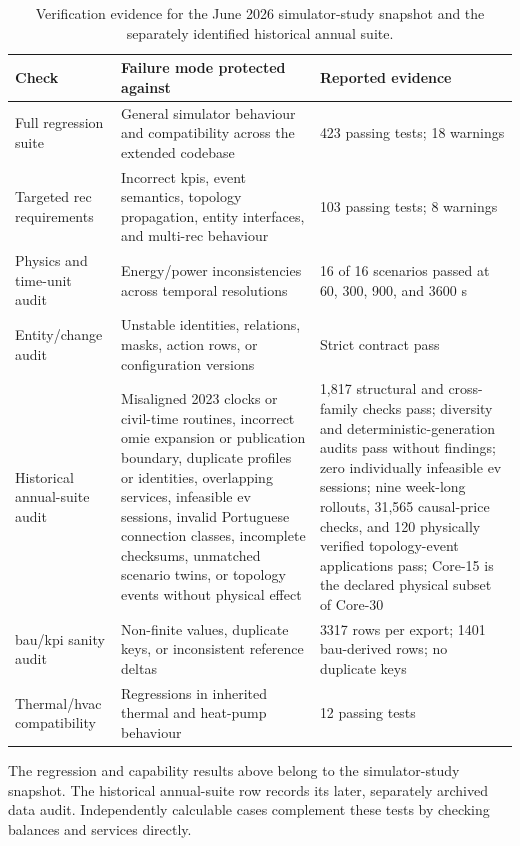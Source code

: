 \begin{table}[H]
\centering
\caption{Verification evidence for the June 2026 simulator-study snapshot and the separately identified historical annual suite.}
\label{tab:sim-validation-evidence}
\footnotesize
\begin{tabularx}{\textwidth}{@{}p{}X p{}@{}}
\toprule
\textbf{Check} & \textbf{Failure mode protected against} & \textbf{Reported evidence} \\
\midrule
Full regression suite & General simulator behaviour and compatibility across the extended codebase & 423 passing tests; 18 warnings \\
Targeted \gls{rec} requirements & Incorrect \glspl{kpi}, event semantics, topology propagation, entity interfaces, and multi-\gls{rec} behaviour & 103 passing tests; 8 warnings \\
Physics and time-unit audit & Energy/power inconsistencies across temporal resolutions & 16 of 16 scenarios passed at 60, 300, 900, and 3600 s \\
Entity/change audit & Unstable identities, relations, masks, action rows, or configuration versions & Strict contract pass \\
Historical annual-suite audit & Misaligned 2023 clocks or civil-time routines, incorrect \gls{omie} expansion or publication boundary, duplicate profiles or identities, overlapping services, infeasible \gls{ev} sessions, invalid Portuguese connection classes, incomplete checksums, unmatched scenario twins, or topology events without physical effect & 1,817 structural and cross-family checks pass; diversity and deterministic-generation audits pass without findings; zero individually infeasible \gls{ev} sessions; nine week-long rollouts, 31,565 causal-price checks, and 120 physically verified topology-event applications pass; Core-15 is the declared physical subset of Core-30 \\
\gls{bau}/\gls{kpi} sanity audit & Non-finite values, duplicate keys, or inconsistent reference deltas & 3317 rows per export; 1401 \gls{bau}-derived rows; no duplicate keys \\
Thermal/\gls{hvac} compatibility & Regressions in inherited thermal and heat-pump behaviour & 12 passing tests \\
\bottomrule
\end{tabularx}
\end{table}

The regression and capability results above belong to the simulator-study snapshot. The historical annual-suite row records its later, separately archived data audit. Independently calculable cases complement these tests by checking balances and services directly.

